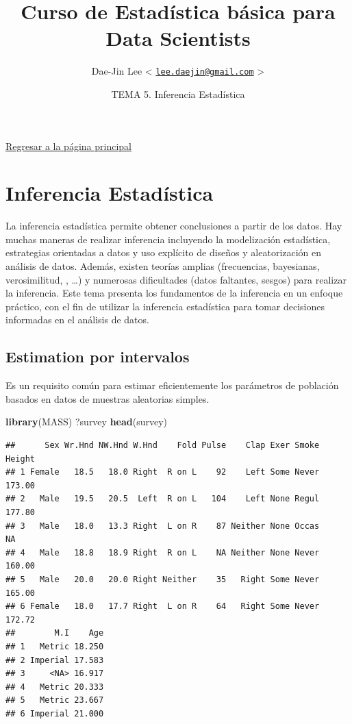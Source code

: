 \documentclass[]{article}
\title{\textbf{Curso de Estadística básica para Data Scientists}}
\author{Dae-Jin Lee \textless{}
\href{mailto:lee.daejin@gmail.com}{\nolinkurl{lee.daejin@gmail.com}}
\textgreater{}}
\date{TEMA 5. Inferencia Estadística}
\newenvironment{Shaded}{\begin{snugshade}}{\end{snugshade}}
\newcommand{\KeywordTok}[1]{\textcolor[rgb]{0.13,0.29,0.53}{\textbf{{#1}}}}
\newcommand{\NormalTok}[1]{{#1}}
\numberwithin{equation}{section}
\begin{document}
\maketitle

{
\hypersetup{linkcolor=black}
\setcounter{tocdepth}{2}
\tableofcontents
}
\newpage

\href{https://idaejin.github.io/bcam-courses/R/datahack/}{Regresar a la
página principal}

\section{Inferencia Estadística}\label{inferencia-estadistica}

La inferencia estadística permite obtener conclusiones a partir de los
datos. Hay muchas maneras de realizar inferencia incluyendo la
modelización estadística, estrategias orientadas a datos y uso explícito
de diseños y aleatorización en análisis de datos. Además, existen
teorías amplias (frecuencias, bayesianas, verosimilitud, , \ldots{}) y
numerosas dificultades (datos faltantes, sesgos) para realizar la
inferencia. Este tema presenta los fundamentos de la inferencia en un
enfoque práctico, con el fin de utilizar la inferencia estadística para
tomar decisiones informadas en el análisis de datos.

\subsection{Estimation por intervalos}\label{estimation-por-intervalos}

Es un requisito común para estimar eficientemente los parámetros de
población basados en datos de muestras aleatorias simples.

\begin{Shaded}
\begin{Highlighting}[]
\KeywordTok{library}\NormalTok{(MASS)}
\NormalTok{?survey}
\KeywordTok{head}\NormalTok{(survey)}
\end{Highlighting}
\end{Shaded}

\begin{verbatim}
##      Sex Wr.Hnd NW.Hnd W.Hnd    Fold Pulse    Clap Exer Smoke Height
## 1 Female   18.5   18.0 Right  R on L    92    Left Some Never 173.00
## 2   Male   19.5   20.5  Left  R on L   104    Left None Regul 177.80
## 3   Male   18.0   13.3 Right  L on R    87 Neither None Occas     NA
## 4   Male   18.8   18.9 Right  R on L    NA Neither None Never 160.00
## 5   Male   20.0   20.0 Right Neither    35   Right Some Never 165.00
## 6 Female   18.0   17.7 Right  L on R    64   Right Some Never 172.72
##        M.I    Age
## 1   Metric 18.250
## 2 Imperial 17.583
## 3     <NA> 16.917
## 4   Metric 20.333
## 5   Metric 23.667
## 6 Imperial 21.000
\end{verbatim}
\end{document}
